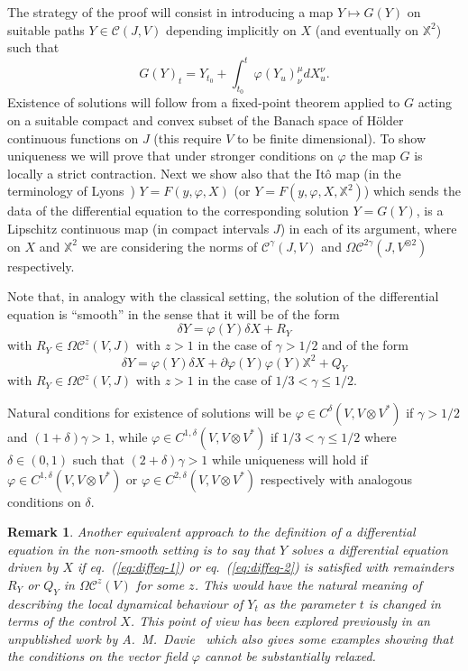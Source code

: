 \documentclass[a4paper,12pt,reqno]{amsproc}
\newcommand{\der}{\delta\!}
\newcommand{\CC}{\mathcal{C}}
\newcommand{\OCC}{\Omega \mathcal{C}}
\newtheorem{remark}{Remark}
\begin{document}
The strategy of the proof will consist in introducing a map $Y \mapsto
G(Y)$ on suitable  paths $Y \in \CC(J,V)$
depending implicitly on $X$ (and eventually on $\mathbb{X}^2$) such that
\begin{equation}
  \label{eq:mapG}
  G(Y)_t = Y_{t_0} + \int_{t_0}^t \varphi(Y_u)^\mu_\nu dX^\nu_u. 
\end{equation}
Existence of solutions will follow from a fixed-point theorem applied
to $G$ acting on a suitable compact and convex  subset of the Banach
space of H\"older continuous functions on $J$
(this require $V$ to be finite dimensional). 
To show uniqueness we will prove that under stronger conditions on
$\varphi$ the map $G$ is locally a strict contraction. 
Next we show also that the It\^o map (in the terminology of
Lyons~\cite{Lyons})  $Y=F(y,\varphi,X) $ (or
$Y=F(y,\varphi,X,\mathbb{X}^2)$) which sends the data of the
differential equation to the corresponding  solution  $Y = G(Y)$, is a
Lipschitz continuous map (in compact intervals $J$) in each of its argument, where
on $X$ and $\mathbb{X}^2$ we are considering the norms of
$\CC^\gamma(J,V)$ and $\OCC^{2\gamma}(J,V^{\otimes 2})$ respectively.


Note that, in analogy with the classical setting, the solution of the differential equation
is ``smooth'' in the sense that it will be of
the form
\begin{equation}
 \label{eq:diffeq-1} 
\der Y = \varphi(Y) \der X + R_Y
\end{equation}
with $R_Y \in \OCC^{z}(V,J)$ with $z>1$ in the case of $\gamma > 1/2$
and of the form
\begin{equation}
  \label{eq:diffeq-2}
\der Y = \varphi(Y) \der X + \partial \varphi(Y) \varphi(Y) \mathbb{X}^2 + Q_Y  \end{equation}
with $R_Y \in \OCC^{z}(V,J)$ with $z>1$ in the case of $1/3 < \gamma
\le 1/2$. 

Natural conditions for existence of solutions will be $\varphi \in
C^{\delta}(V,V\otimes V^*)$ if $\gamma > 1/2$ and $(1+\delta)\gamma >
1$, while $\varphi \in
C^{1,\delta}(V,V\otimes V^*)$ if $1/3 < \gamma \le 1/2$ where $\delta \in
(0,1)$ such that $(2+\delta)\gamma > 1$ while uniqueness will
hold if $\varphi \in C^{1,\delta}(V,V\otimes V^*)$ or $\varphi \in
C^{2,\delta}(V,V\otimes V^*)$ 
respectively with analogous conditions on $\delta$.

\begin{remark}
Another equivalent approach to the definition of a differential equation
in the non-smooth setting is to say that $Y$ solves a differential
equation driven by $X$ if eq.~(\ref{eq:diffeq-1}) or
eq.~(\ref{eq:diffeq-2}) is satisfied with remainders $R_Y$ or $Q_Y$
in $\OCC^z(V)$ for some $z$. This would have the natural meaning of
describing the local dynamical behaviour of $Y_t$ as the parameter $t$
is changed in terms of the control $X$. This point of view has been
explored previously in an unpublished work by A.~M.~Davie~\cite{Davie}
which also gives some examples showing that the conditions on the
vector field $\varphi$ cannot be substantially relaxed.  
\end{remark}
\end{document}
